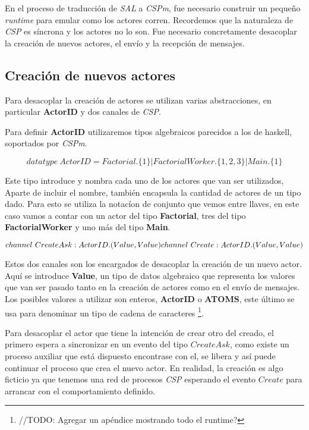 \documentclass[fleqn]{article}
\begin{document}
En el proceso de traducción de \textit{SAL} a \textit{CSPm}, fue necesario construir un pequeño
\textit{runtime} para emular como los actores corren. Recordemos que la
naturaleza de \textit{CSP} es síncrona y los actores no lo son. Fue necesario
concretamente desacoplar la creación de nuevos actores, el envío y la recepción de mensajes. 

\subsection{Creación de nuevos actores}

Para desacoplar la creación de actores se utilizan varias abstracciones, en particular
\textbf{ActorID} y dos canales de \textit{CSP}.

Para definir \textbf{ActorID} utilizaremos tipos algebraicos parecidos a los de
haskell, soportados por \textit{CSPm}.

\[
datatype\ ActorID = Factorial.\{1\} | FactorialWorker.\{1,2,3\} | Main.\{1\}
\]

Este tipo introduce y nombra cada uno de los actores que van ser utilizados,
Aparte de incluir el nombre, también encapsula la cantidad de actores de un tipo
dado.
Para esto se utiliza la notacíon de conjunto que vemos entre llaves, en este
caso vamos a contar con un actor del tipo \textbf{Factorial}, tres del tipo
\textbf{FactorialWorker} y uno más del tipo \textbf{Main}.


\[
channel\ CreateAsk:ActorID.(Value, Value)\\
channel\ Create:ActorID.(Value, Value)
\]

Estos dos canales son los encargados de desacoplar la creación de un nuevo
actor. Aquí se introduce \textbf{Value}, un tipo de datos algebraico que
representa los valores que van ser pasado tanto en la creación de actores como en
el envío de mensajes. Los posibles valores a utilizar son enteros, \textbf{ActorID} o
\textbf{ATOMS}, este último se usa para denominar un tipo de cadena de
caracteres \footnote{//TODO: Agregar un apéndice mostrando todo el runtime?}. 

Para desacoplar el actor que tiene la intención de crear otro del creado, el primero
espera a sincronizar en un evento del tipo $CreateAsk$, como existe un proceso
auxiliar que está dispuesto encontrase con el, se libera y así puede continuar
el proceso que crea el nuevo actor. En realidad, la creación es algo ficticio ya
que tenemos una red de procesos \textit{CSP} esperando el evento $Create$ para
arrancar con el comportamiento definido.
\end{document}
